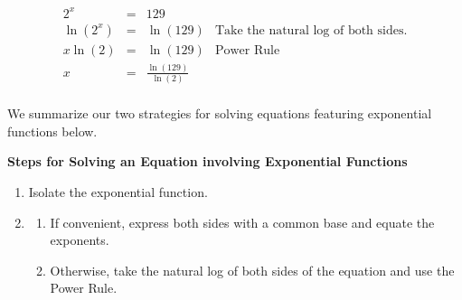 \documentclass{ximera}
\begin{document}
\[ \begin{array}{rclr}
2^{x} & = & 129 & \\
\ln\left(2^{x}\right) & = & \ln(129) & \text{Take the natural log of both sides.} \\
x \ln(2) & = & \ln(129) & \text{Power Rule} \\  
x & = &\frac{\ln(129)}{\ln(2)} & \\
\end{array}\]

We summarize our two strategies for solving equations featuring exponential functions below.




\centerline{\textbf{Steps for Solving an Equation involving Exponential Functions}} 

\begin{enumerate}

\item  Isolate the exponential function.

\item  

\begin{enumerate}

\item  If convenient, express both sides with a common base and equate the exponents.

\item  Otherwise, take the natural log of both sides of the equation and use the Power Rule.


\end{enumerate}


\end{enumerate}

\end{document}
